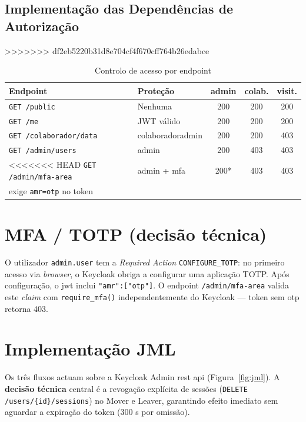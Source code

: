 \subsection{Implementação das Dependências de Autorização}

>>>>>>> df2eb5220b31d8e704cf4f670cff764b26edabce
\begin{table}[h!]
\centering
\caption{Controlo de acesso por endpoint}
\label{tab:endpoints}
\begin{tabular}{|l|l|c|c|c|}
\hline
\textbf{Endpoint} & \textbf{Proteção} & \textbf{admin} & \textbf{colab.} & \textbf{visit.} \\ \hline
\texttt{GET /public} & Nenhuma & 200 & 200 & 200 \\ \hline
\texttt{GET /me} & JWT válido & 200 & 200 & 200 \\ \hline
\texttt{GET /colaborador/data} & colaborador\textbar{}admin & 200 & 200 & 403 \\ \hline
\texttt{GET /admin/users} & admin & 200 & 403 & 403 \\ \hline
<<<<<<< HEAD
\texttt{GET /admin/mfa-area} & admin + \gls{mfa} & 200* & 403 & 403 \\ \hline
\multicolumn{5}{l}{\footnotesize * exige \texttt{amr=otp} no token} \\
\end{tabular}
\end{table}

\section{MFA / TOTP (decisão técnica)}

O utilizador \texttt{admin.user} tem a \textit{Required Action} \texttt{CONFIGURE\_TOTP}: no primeiro acesso via \textit{browser}, o Keycloak obriga a configurar uma aplicação TOTP. Após configuração, o \gls{jwt} inclui \texttt{"amr":["otp"]}. O endpoint \texttt{/admin/mfa-area} valida este \textit{claim} com \texttt{require\_mfa()} independentemente do Keycloak — token sem \gls{otp} retorna 403.

\section{Implementação JML}

Os três fluxos actuam sobre a Keycloak Admin \gls{rest} \gls{api} (Figura~\ref{fig:jml}). A \textbf{decisão técnica} central é a revogação explícita de sessões (\texttt{DELETE /users/\{id\}/sessions}) no Mover e Leaver, garantindo efeito imediato sem aguardar a expiração do token (300 s por omissão).

